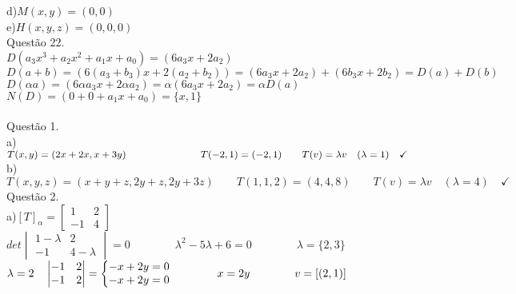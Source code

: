 \documentclass[12pt]{article}
\begin{document}
\noindent d)\quad$M(x,y)=(0,0)$\\

\noindent e)\quad$H(x,y,z)=(0,0,0)$\\

\noindent Questão 22.\\

$D(a_{3}x^{3}+a_{2}x^{2}+a_{1}x+a_{0})=(6a_{3}x+2a_{2})$\\

$D(a+b)=(6(a_{3}+b_{3})x+2(a_{2}+b_{2}))=(6a_{3}x+2a_{2})+(6b_{3}x+2b_{2})=D(a)+D(b)$\\

$D(\alpha a)=(6\alpha a_{3}x+2\alpha a_{2})=\alpha(6a_{3}x+2a_{2})=\alpha D(a)$\\

$N(D)=(0+0+a_{1}x+a_{0})=\lbrace x,1\rbrace$\\

\\

\noindent Questão 1.\\

\noindent a) $T(x,y)=(2x+2x,x+3y)\qquad\qquad\qquad\text{\hspace{+14pt}}T(-2,1)=(-2,1)\qquad T(v)=\lambda v\quad(\lambda=1)\quad\checkmark$\\

\noindent b) $T(x,y,z)=(x+y+z,2y+z,2y+3z)\qquad T(1,1,2)=(4,4,8)\qquad T(v)=\lambda v\quad(\lambda=4)\quad\checkmark$\\

\noindent Questão 2.\\

\noindent a)\quad$[T]_{\alpha}=\begin{bmatrix}1&2\\-1&4\end{bmatrix}$\\

$det\begin{vmatrix}1-\lambda&2\\-1&4-\lambda\end{vmatrix}=0\qquad\qquad\lambda^{2}-5\lambda+6=0\qquad\qquad\lambda=\lbrace2,3\rbrace$\\

$\lambda=2\quad\begin{vmatrix}-1&2\\-1&2\end{vmatrix}=\left\{\begin{array}{@{}l@{}}-x+2y=0\\-x+2y=0\end{array}\right.\qquad\qquad x=2y\qquad\qquad v=[(2,1)]$\\
\end{document}
